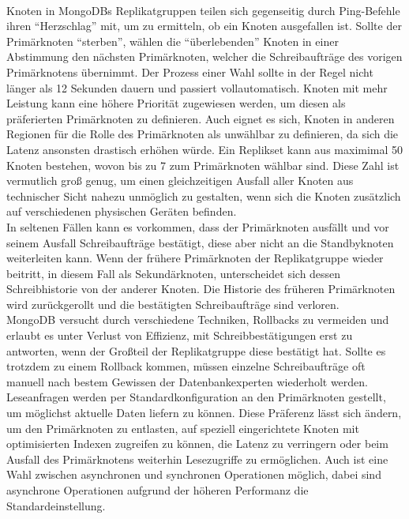 \paragraph{}
Knoten in MongoDBs Replikatgruppen teilen sich gegenseitig durch Ping-Befehle ihren \enquote{Herzschlag} mit, um zu ermitteln, ob ein Knoten ausgefallen ist. Sollte der Primärknoten \enquote{sterben}, wählen die \enquote{überlebenden} Knoten in einer Abstimmung den nächsten Primärknoten, welcher die Schreibaufträge des vorigen Primärknotens übernimmt. Der Prozess einer Wahl sollte in der Regel nicht länger als 12 Sekunden dauern und passiert vollautomatisch. Knoten mit mehr Leistung kann eine höhere Priorität zugewiesen werden, um diesen als präferierten Primärknoten zu definieren. Auch eignet es sich, Knoten in anderen Regionen für die Rolle des Primärknoten als unwählbar zu definieren, da sich die Latenz ansonsten drastisch erhöhen würde. Ein Replikset kann aus maximimal 50 Knoten bestehen, wovon bis zu 7 zum Primärknoten wählbar sind. \cite{MG3} \cite{MG4} Diese Zahl ist vermutlich groß genug, um einen gleichzeitigen Ausfall aller Knoten aus technischer Sicht nahezu unmöglich zu gestalten, wenn sich die Knoten zusätzlich auf verschiedenen physischen Geräten befinden.\\
In seltenen Fällen kann es vorkommen, dass der Primärknoten ausfällt und vor seinem Ausfall Schreibaufträge bestätigt, diese aber nicht an die Standbyknoten weiterleiten kann. Wenn der frühere Primärknoten der Replikatgruppe wieder beitritt, in diesem Fall als Sekundärknoten, unterscheidet sich dessen Schreibhistorie von der anderer Knoten. Die Historie des früheren Primärknoten wird zurückgerollt und die bestätigten Schreibaufträge sind verloren.\\
MongoDB versucht durch verschiedene Techniken, Rollbacks zu vermeiden und erlaubt es unter Verlust von Effizienz, mit Schreibbestätigungen erst zu antworten, wenn der Großteil der Replikatgruppe diese bestätigt hat. Sollte es trotzdem zu einem Rollback kommen, müssen einzelne Schreibaufträge oft manuell nach bestem Gewissen der Datenbankexperten wiederholt werden. \cite{MG5}\\
Leseanfragen werden per Standardkonfiguration an den Primärknoten gestellt, um möglichst aktuelle Daten liefern zu können. Diese Präferenz lässt sich ändern, um den Primärknoten zu entlasten, auf speziell eingerichtete Knoten mit optimisierten Indexen zugreifen zu können, die Latenz zu verringern oder beim Ausfall des Primärknotens weiterhin Lesezugriffe zu ermöglichen. Auch ist eine Wahl zwischen asynchronen und synchronen Operationen möglich, dabei sind asynchrone Operationen aufgrund der höheren Performanz die Standardeinstellung.

